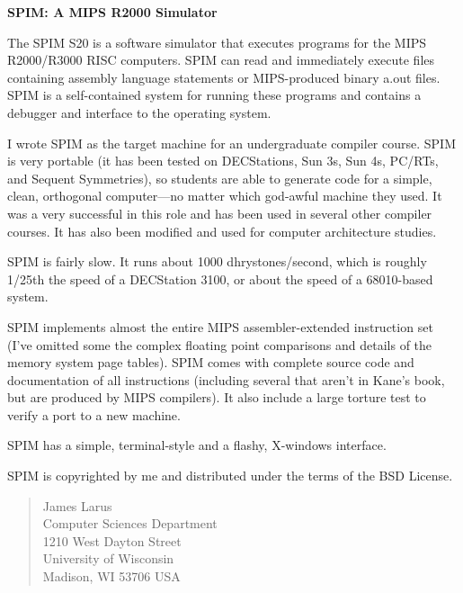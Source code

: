


\begin{center}
  \LARGE\bf SPIM: A MIPS R2000 Simulator
\end{center}

The SPIM S20 is a software simulator that executes programs for the
MIPS R2000/R3000 RISC computers.  SPIM can read and immediately
execute files containing assembly language statements or MIPS-produced
binary a.out files.  SPIM is a self-contained system for running these
programs and contains a debugger and interface to the operating
system.

I wrote SPIM as the target machine for an undergraduate compiler
course. SPIM is very portable (it has been tested on DECStations, Sun
3s, Sun 4s, PC/RTs, and Sequent Symmetries), so students are able to
generate code for a simple, clean, orthogonal computer---no matter
which god-awful machine they used.  It was a very successful in this
role and has been used in several other compiler courses.  It has also
been modified and used for computer architecture studies.

SPIM is fairly slow.  It runs about 1000 dhrystones/second, which is
roughly 1/25th the speed of a DECStation 3100, or about the speed of a
68010-based system.

SPIM implements almost the entire MIPS assembler-extended instruction
set (I've omitted some the complex floating point comparisons and
details of the memory system page tables).  SPIM comes with complete
source code and documentation of all instructions (including several
that aren't in Kane's book, but are produced by MIPS compilers).  It
also include a large torture test to verify a port to a new machine.

SPIM has a simple, terminal-style and a flashy, X-windows interface.

SPIM is copyrighted by me and distributed under the terms of the BSD
License.

\begin{quote}
James Larus\\
Computer Sciences Department\\
1210 West Dayton Street\\
University of Wisconsin\\
Madison, WI 53706 USA\\
\end{quote}

